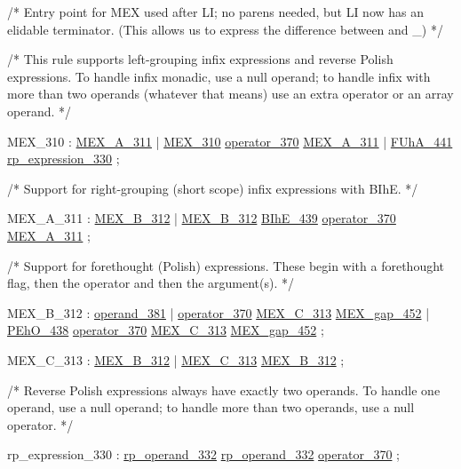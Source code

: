 /*  Entry point for MEX used after LI; no parens needed, but LI now has an
    elidable terminator. (This allows us to express the difference between
     and _)   */

/*  This rule supports left-grouping infix expressions and reverse Polish
    expressions. To handle infix monadic, use a null operand; to handle
    infix with more than two operands (whatever that means) use an extra
    operator or an array operand.   */

\label{html:y310}
MEX_310                 :  \hyperref[html:y311]{MEX_A_311}
                        |  \hyperref[html:y310]{MEX_310}  \hyperref[html:y370]{operator_370}  \hyperref[html:y311]{MEX_A_311}
                        |  \hyperref[html:y441]{FUhA_441}  \hyperref[html:y330]{rp_expression_330}
                        ;

/*  Support for right-grouping (short scope) infix expressions with BIhE.  */

\label{html:y311}
MEX_A_311               :  \hyperref[html:y312]{MEX_B_312}
                        |  \hyperref[html:y312]{MEX_B_312}  \hyperref[html:y439]{BIhE_439}  \hyperref[html:y370]{operator_370}  \hyperref[html:y311]{MEX_A_311}
                        ;

/*  Support for forethought (Polish) expressions. These begin with a
    forethought flag, then the operator and then the argument(s).  */

\label{html:y312}
MEX_B_312               :  \hyperref[html:y381]{operand_381}
                        |  \hyperref[html:y370]{operator_370}  \hyperref[html:y313]{MEX_C_313}  \hyperref[html:y452]{MEX_gap_452}
                        |  \hyperref[html:y438]{PEhO_438}  \hyperref[html:y370]{operator_370}  \hyperref[html:y313]{MEX_C_313}  \hyperref[html:y452]{MEX_gap_452}
                        ;

\label{html:y313}
MEX_C_313               :  \hyperref[html:y312]{MEX_B_312}
                        |  \hyperref[html:y313]{MEX_C_313}  \hyperref[html:y312]{MEX_B_312}
                        ;

/*  Reverse Polish expressions always have exactly two operands.
    To handle one operand, use a null operand;
    to handle more than two operands, use a null operator.  */

\label{html:y330}
rp_expression_330       :  \hyperref[html:y332]{rp_operand_332}  \hyperref[html:y332]{rp_operand_332}  \hyperref[html:y370]{operator_370}
                        ;

